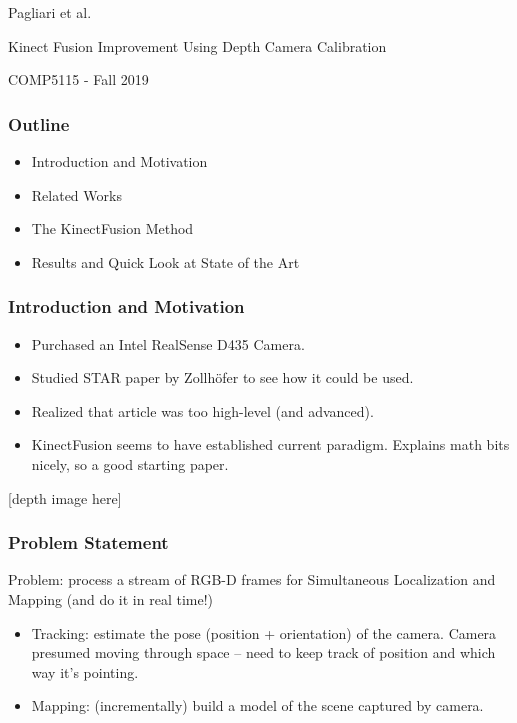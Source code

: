 \begin{frame}

\begin{center}
{\Large
Pagliari et al.

Kinect Fusion Improvement Using Depth Camera Calibration}

COMP5115 - Fall 2019
\end{center}
\end{frame}

\begin{frame}
\frametitle{Outline}

\begin{itemize}
\item Introduction and Motivation
\item Related Works
\item The KinectFusion Method
\item Results and Quick Look at State of the Art
\end{itemize}

\end{frame}

\begin{frame}
\frametitle{Introduction and Motivation}

\begin{itemize}
\item Purchased an Intel RealSense D435 Camera.
\item Studied STAR paper by Zollh\"ofer to see how it could be used.
\item Realized that article was too high-level (and advanced).
\item KinectFusion seems to have established current paradigm. Explains math bits nicely,
so a good starting paper.
\end{itemize}

[depth image here]

\end{frame}

\begin{frame}
\frametitle{Problem Statement}

Problem: process a stream of RGB-D frames for Simultaneous Localization and Mapping
(and do it in real time!)

\begin{itemize}
  \item Tracking: estimate the pose (position + orientation) of the camera.
  Camera presumed moving through space -- need to keep track of position and which way it's pointing.
  \item Mapping: (incrementally) build a model of the scene captured by camera.
\end{itemize}
\end{frame}

